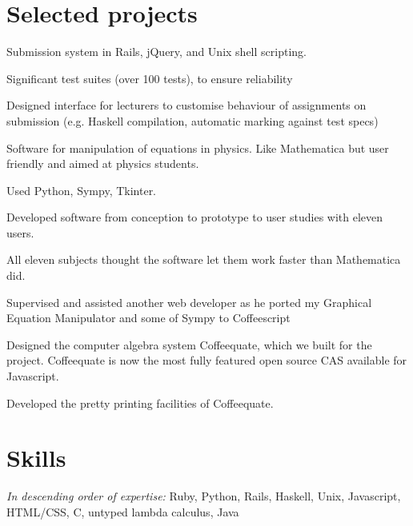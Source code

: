 \documentclass[letterpaper]{resume}
\begin{document}
\section{Selected projects}

\begin{compactitem}
\item Submission system in Rails, jQuery, and Unix shell scripting.
\item Significant test suites (over 100 tests), to ensure reliability
\item Designed interface for lecturers to customise behaviour of assignments on submission (e.g. Haskell compilation, automatic marking against test specs)
\end{compactitem}

\begin{compactitem}
\item Software for manipulation of equations in physics. Like Mathematica but user friendly and aimed at physics students.
\item Used Python, Sympy, Tkinter.
\item Developed software from conception to prototype to user studies with eleven users.
\item All eleven subjects thought the software let them work faster than Mathematica did.
\end{compactitem}

\begin{compactitem}
\item Supervised and assisted another web developer as he ported my Graphical Equation Manipulator and some of Sympy to Coffeescript
\item Designed the computer algebra system Coffeequate, which we built for the project. Coffeequate is now the most fully featured open source CAS available for Javascript.
\item Developed the pretty printing facilities of Coffeequate.
\end{compactitem}

\section{Skills}

\textit{In descending order of expertise:} Ruby, Python, Rails, Haskell, Unix, Javascript, HTML/CSS, C, untyped lambda calculus, Java
\end{document}
